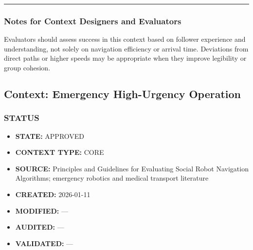 \documentclass[utf8]{frontiers_suppmat} %
\newenvironment{Shaded}{\begin{shaded}}{\end{shaded}}
\providecommand{\tightlist}{%
  \setlength{\itemsep}{0pt}\setlength{\parskip}{0pt}}
\begin{document}
\begin{Shaded}
\begin{Highlighting}[]
\KeywordTok{:}
\AttributeTok{  }\KeywordTok{:}
\AttributeTok{    }\KeywordTok{{-}}
\AttributeTok{    }\KeywordTok{{-}}
\AttributeTok{  }\KeywordTok{:}
\AttributeTok{    }\KeywordTok{{-}}
\AttributeTok{    }\KeywordTok{{-}}

\KeywordTok{:}
\AttributeTok{  }\KeywordTok{{-}}
\AttributeTok{  }\KeywordTok{{-}}
\AttributeTok{  }\KeywordTok{{-}}
\end{Highlighting}
\end{Shaded}

\begin{center}\rule{0.5\linewidth}{0.5pt}\end{center}

\subsubsection{Notes for Context Designers and
Evaluators}\label{notes-for-context-designers-and-evaluators}

Evaluators should assess success in this context based on follower
experience and understanding, not solely on navigation efficiency or
arrival time. Deviations from direct paths or higher speeds may be
appropriate when they improve legibility or group cohesion.


\subsection{Context: Emergency High-Urgency
Operation}\label{context-emergency-high-urgency-operation}

\subsubsection{STATUS}\label{status}

\begin{itemize}
\tightlist
\item
  \textbf{STATE:} APPROVED
\item
  \textbf{CONTEXT TYPE:} CORE
\item
  \textbf{SOURCE:} Principles and Guidelines for Evaluating Social Robot
  Navigation Algorithms; emergency robotics and medical transport
  literature
\item
  \textbf{CREATED:} 2026-01-11
\item
  \textbf{MODIFIED:} ---
\item
  \textbf{AUDITED:} ---
\item
  \textbf{VALIDATED:} ---
\end{itemize}
\end{document}
